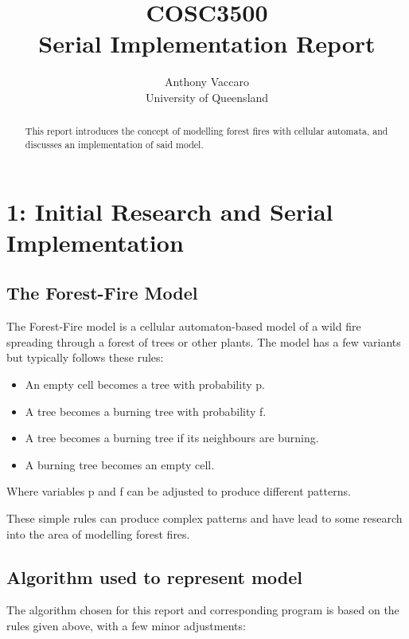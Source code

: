 \documentclass[11pt,a4paper]{report}
\begin{document}
\title{COSC3500\\Serial Implementation Report}
\author{Anthony Vaccaro\\University of Queensland}

\maketitle
\begin{abstract}
This report introduces the concept of modelling forest fires with cellular
automata, and discusses an implementation of said model.
\end{abstract}

\newpage
\tableofcontents
\newpage

\chapter{1: Initial Research and Serial Implementation}

\newpage
\section{The Forest-Fire Model}

The Forest-Fire model is a cellular automaton-based model of a wild fire
spreading through a forest of trees or other plants. The model has a few
variants but typically follows these rules:

\begin{itemize}
\item An empty cell becomes a tree with probability p.
\item A tree becomes a burning tree with probability f.
\item A tree becomes a burning tree if its neighbours are burning.
\item A burning tree becomes an empty cell.
\end{itemize}
Where variables p and f can be adjusted to produce different patterns.

These simple rules can produce complex patterns and have lead to some research
into the area of modelling forest fires.

\newpage
\section{Algorithm used to represent model}

The algorithm chosen for this report and corresponding program is based on the
rules given above, with a few minor adjustments:
\end{document}
